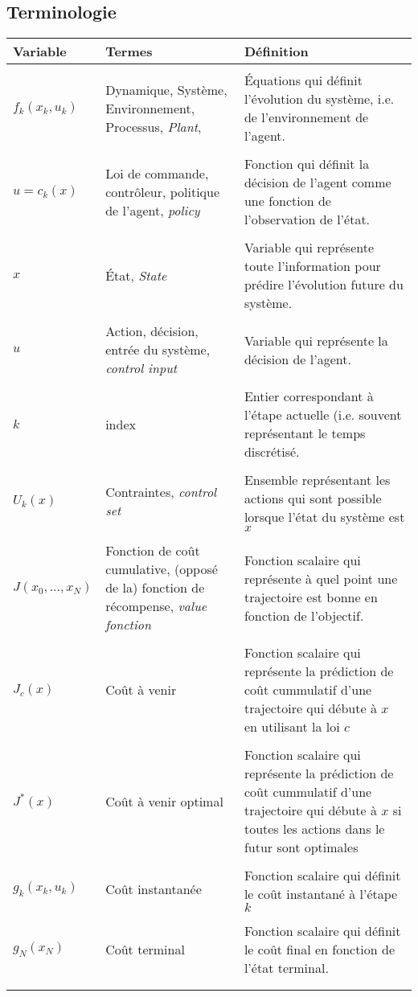 \newpage
\subsection{Terminologie}

\begin{center}
\begin{tabular}{  p{3.0cm} p{6.0cm} p{7.0cm} }
\hline 
\textbf{Variable} & \textbf{Termes} & \textbf{Définition} \\ \hline\hline \\
$f_k(x_k,u_k)$ & Dynamique, Système, Environnement, Processus, \textit{Plant}, &
Équations qui définit l'évolution du système, i.e. de l'environnement de l'agent.
\\  &  \\ 
$u=c_k(x)$ & Loi de commande, contrôleur, politique de l'agent, \textit{policy} &
Fonction qui définit la décision de l'agent comme une fonction de l'observation de l'état.
\\  &  \\ 
$x$ & État, \textit{State} &
Variable qui représente toute l'information pour prédire l'évolution future du système.
\\  &  \\ 
$u$ & Action, décision, entrée du système, \textit{control input} &
Variable qui représente la décision de l'agent.
\\  &  \\ 
$k$ & index &
Entier correspondant à l'étape actuelle (i.e. souvent représentant le temps discrétisé. 
\\  &  \\ 
$U_k(x)$ & Contraintes, \textit{control set} &
Ensemble représentant les actions qui sont possible lorsque l'état du système est $x$
\\  &  \\ 
$J(x_0, ... , x_N)$ & Fonction de coût cumulative, (opposé de la) fonction de récompense, \textit{value fonction} &
Fonction scalaire qui représente à quel point une trajectoire est bonne en fonction de l'objectif.
\\  &  \\ 
$J_c(x)$ & Coût à venir &
Fonction scalaire qui représente la prédiction de coût cummulatif d'une trajectoire qui débute à $x$ en utilisant la loi $c$
\\  &  \\ 
$J^*(x)$ & Coût à venir optimal &
Fonction scalaire qui représente la prédiction de coût cummulatif d'une trajectoire qui débute à $x$ si toutes les actions dans le futur sont optimales
\\  &  \\
$g_k(x_k,u_k)$ & Coût instantanée & Fonction scalaire qui définit le coût instantané à l'étape $k$
\\  &  \\ 
$g_N(x_N)$ & Coût terminal &
Fonction scalaire qui définit le coût final en fonction de l'état terminal.
\\  &  \\ 
\hline
\label{tab}
\end{tabular}
\end{center}




